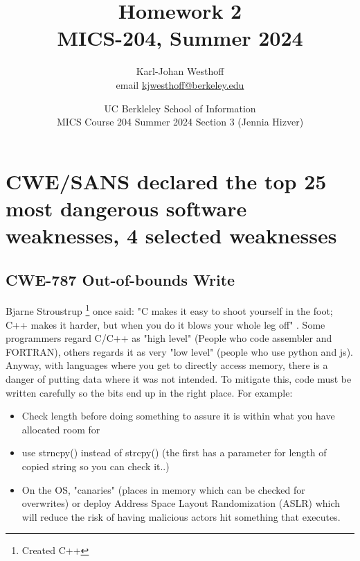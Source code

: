 \documentclass[
	letterpaper, %
	10pt, %
	unnumberedsections, %
	twoside, %
]{LTJournalArticle}
\title{Homework 2 \\ MICS-204, Summer 2024} %
\author{
	Karl-Johan Westhoff \\
	email \href{mailto:kjwesthoff@berkeley.edu}{kjwesthoff@berkeley.edu}
}
\date{UC Berkleley School of Information \\
MICS Course 204 Summer 2024 Section 3 (Jennia Hizver)
}
\begin{document}
\onecolumn
\maketitle %


\section{CWE/SANS declared the top 25 most dangerous software weaknesses, 4 selected weaknesses}

\subsection{CWE-787 Out-of-bounds Write}
Bjarne Stroustrup \footnote{Created C++} once said: "C makes it easy to shoot yourself in the foot; C++ makes it harder, but when you do it blows your whole leg off" \cite{BjarneStroustrupHomepage}. Some programmers regard C/C++ as "high level" (People who code assembler and FORTRAN), others regards it as very "low level" (people who use python and js). Anyway, with languages where you get to directly access memory, there is a danger of putting data where it was not intended. To mitigate this, code must be written carefully so the bits end up in the right place. For example:

\begin{itemize}
	\item Check length before doing something to assure it is within what you have allocated room for
	\item use strncpy() instead of strcpy() (the first has a parameter for length of copied string so you can check it..)
	\item On the OS, "canaries" (places in memory which can be checked for overwrites) or deploy Address Space Layout Randomization (ASLR) which will reduce the risk of having malicious actors hit something that executes. 
\end{itemize}
\end{document}
